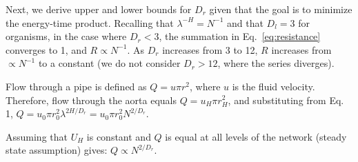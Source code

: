 \documentclass[12pt]{article}
\begin{document}
Next, we derive upper and lower bounds for $D_r$ given that the goal
is to minimize the energy-time product.  Recalling that $\lambda^{-H} = N^{-1}$ and that $D_l = 3$ for organisms, 
in the case where $D_r <  3$, the summation in Eq.~\ref{eq:resistance} converges to 1, and $R
\propto N^{-1}$.   As $D_r$ increases from 3 to 12, $R$ increases from
$\propto N^{-1}$ to a constant (we do not consider $D_r > 12$, where the series diverges).



Flow through a pipe is defined as $Q = u\pi r^2$, where $u$ is the fluid 
velocity. 
Therefore, flow through the aorta equals
$Q = u_H \pi r_{H}^2$, and substituting from Eq. 1, $Q = u_0 \pi r_0^2
\lambda^{2H/D_r} = u_0 \pi r_0^2N^{2/D_r} $. 

Assuming that $U_H$ is constant and $Q$ is equal at all levels of the
network (steady state assumption) gives:
$ Q \propto  N^{2/D_r}$.  


\end{document}
